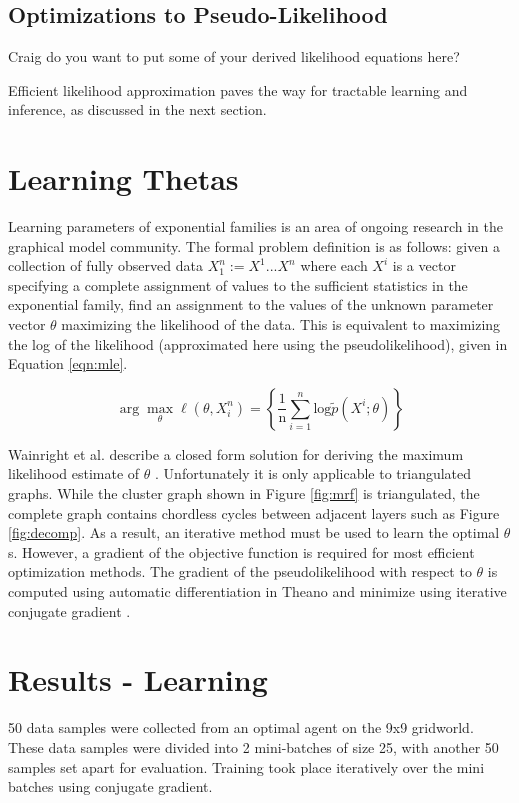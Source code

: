 \documentclass{article} %
\begin{document}
\subsection{Optimizations to Pseudo-Likelihood}
Craig do you want to put some of your derived likelihood equations here?

Efficient likelihood approximation paves the way for tractable learning and inference, as discussed in the next section.

\section{Learning Thetas}
Learning parameters of exponential families is an area of ongoing research in the graphical model community. The formal problem definition is as follows: given a collection of fully observed data $X_1^n := {X^1...X^n}$ where each $X^i$ is a vector specifying a complete assignment of values to the sufficient statistics in the exponential family, find an assignment to the values of the unknown parameter vector $\theta$ maximizing the likelihood of the data. This is equivalent to maximizing the log of the likelihood (approximated here using the pseudolikelihood), given in Equation \ref{eqn:mle}.

\begin{equation}
\arg\max_\theta \ell(\theta,X_i^n)
=
\left\{
  \frac{1}{\textrm{n}}\sum_{i=1}^{n}\textrm{log}\tilde{p}(X^i; \theta)
\right\}
\label{eqn:mle}
\end{equation}

Wainright et al. describe a closed form solution for deriving the maximum likelihood estimate of $\theta$ \cite{wainwright08}. Unfortunately it is only applicable to triangulated graphs. While the cluster graph shown in Figure \ref{fig:mrf} is triangulated, the complete graph contains chordless cycles between adjacent layers such as Figure \ref{fig:decomp}. As a result, an iterative method must be used to learn the optimal $\theta$s. However, a gradient of the objective function is required for most efficient optimization methods. The gradient of the pseudolikelihood with respect to $\theta$ is computed using automatic differentiation in Theano \cite{bergstra10} and minimize using iterative conjugate gradient \cite{hestenes52}. 

\section{Results - Learning}
50 data samples were collected from an optimal agent on the 9x9 gridworld. These data samples were divided into 2 mini-batches of size 25, with another 50 samples set apart for evaluation. Training took place iteratively over the mini batches using conjugate gradient.
\end{document}

